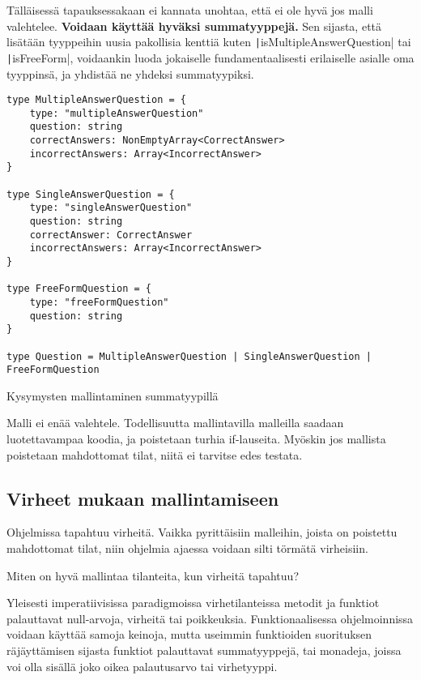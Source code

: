 Tälläisessä tapauksessakaan ei kannata unohtaa, että ei ole hyvä jos malli valehtelee. \textbf{Voidaan käyttää hyväksi summatyyppejä.} Sen sijasta, että lisätään tyyppeihin uusia pakollisia kenttiä kuten \texttt|isMultipleAnswerQuestion| tai \texttt|isFreeForm|, voidaankin luoda jokaiselle fundamentaalisesti erilaiselle asialle oma tyyppinsä, ja yhdistää ne yhdeksi summatyypiksi.

\begin{code}
    \begin{verbatim}
type MultipleAnswerQuestion = {
    type: "multipleAnswerQuestion"
    question: string
    correctAnswers: NonEmptyArray<CorrectAnswer>
    incorrectAnswers: Array<IncorrectAnswer>
}

type SingleAnswerQuestion = {
    type: "singleAnswerQuestion"
    question: string
    correctAnswer: CorrectAnswer
    incorrectAnswers: Array<IncorrectAnswer>
}

type FreeFormQuestion = {
    type: "freeFormQuestion"
    question: string
}

type Question = MultipleAnswerQuestion | SingleAnswerQuestion | FreeFormQuestion
    \end{verbatim}
    \caption{Kysymysten mallintaminen summatyypillä}
    \label{code:ts_sum_type_nice}
\end{code}

Malli ei enää valehtele. Todellisuutta mallintavilla malleilla saadaan luotettavampaa koodia, ja poistetaan turhia if-lauseita. Myöskin jos mallista poistetaan mahdottomat tilat, niitä ei tarvitse edes testata.

\subsection{Virheet mukaan mallintamiseen}

Ohjelmissa tapahtuu virheitä. Vaikka pyrittäisiin malleihin, joista on poistettu mahdottomat tilat, niin ohjelmia ajaessa voidaan silti törmätä virheisiin.

Miten on hyvä mallintaa tilanteita, kun virheitä tapahtuu?

Yleisesti imperatiivisissa paradigmoissa virhetilanteissa metodit ja funktiot palauttavat null-arvoja, virheitä tai poikkeuksia.
Funktionaalisessa ohjelmoinnissa voidaan käyttää samoja keinoja, mutta useimmin funktioiden suorituksen räjäyttämisen sijasta funktiot palauttavat summatyyppejä, tai monadeja, joissa voi olla sisällä joko oikea palautusarvo tai virhetyyppi.


